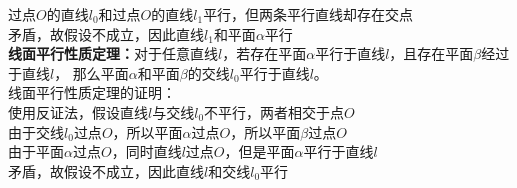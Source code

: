 \documentclass[UTF8]{ctexart}
\begin{document}
    过点$O$的直线$l_0$和过点$O$的直线$l_1$平行，但两条平行直线却存在交点\\[2mm]
    矛盾，故假设不成立，因此直线$l_1$和平面$\alpha$平行\\[6mm]
    \textbf{线面平行性质定理：}对于任意直线$l$，若存在平面$\alpha$平行于直线$l$，且存在平面$\beta$经过于直线$l$，
    那么平面$\alpha$和平面$\beta$的交线$l_0$平行于直线$l$。\\[4mm]
    线面平行性质定理的证明：\\[3mm]
    使用反证法，假设直线$l$与交线$l_0$不平行，两者相交于点$O$\\[2mm]
    由于交线$l_0$过点$O$，所以平面$\alpha$过点$O$，所以平面$\beta$过点$O$\\[2mm]
    由于平面$\alpha$过点$O$，同时直线$l$过点$O$，但是平面$\alpha$平行于直线$l$\\[2mm]
    矛盾，故假设不成立，因此直线$l$和交线$l_0$平行

\newpage
\end{document}
